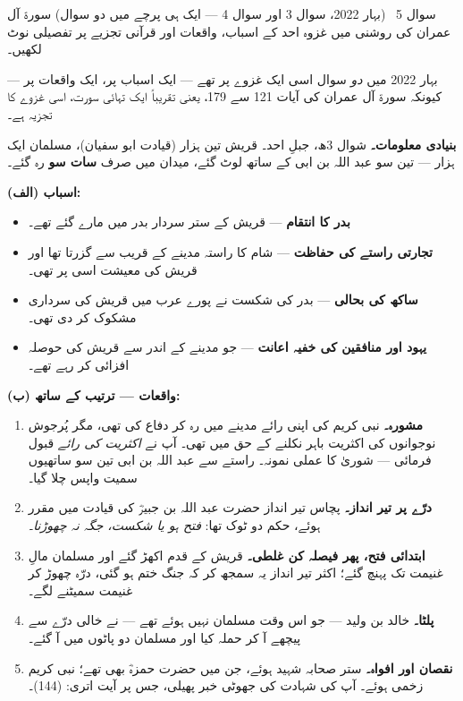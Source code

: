 \begin{sawal}{سوال \textenglish{5} \ \textnormal{\small(بہار \textenglish{2022}، سوال \textenglish{3} اور سوال \textenglish{4} --- ایک ہی پرچے میں دو سوال)}}
سورۃ آل عمران کی روشنی میں غزوہ احد کے اسباب، واقعات اور قرآنی تجزیے پر تفصیلی
نوٹ لکھیں۔
\end{sawal}

\begin{hal}
بہار \textenglish{2022} میں \emph{دو} سوال اسی ایک غزوے پر تھے --- ایک اسباب
پر، ایک واقعات پر --- کیونکہ سورۃ آل عمران کی آیات \textenglish{121} سے
\textenglish{179}، یعنی تقریباً ایک تہائی سورت، اسی غزوے کا تجزیہ ہے۔

\medskip
\textbf{بنیادی معلومات۔} شوال \textenglish{3}ھ، جبلِ احد۔ قریش تین ہزار
(قیادت ابو سفیان)، مسلمان ایک ہزار --- تین سو عبد اللہ بن ابی کے ساتھ لوٹ
گئے، میدان میں صرف \textbf{سات سو} رہ گئے۔

\medskip
\textbf{(الف) اسباب:}
\begin{itemize}\setlength{\itemsep}{1pt}
  \item \textbf{بدر کا انتقام} --- قریش کے ستر سردار بدر میں مارے گئے تھے۔
  \item \textbf{تجارتی راستے کی حفاظت} --- شام کا راستہ مدینے کے قریب سے گزرتا
        تھا اور قریش کی معیشت اسی پر تھی۔
  \item \textbf{ساکھ کی بحالی} --- بدر کی شکست نے پورے عرب میں قریش کی سرداری
        مشکوک کر دی تھی۔
  \item \textbf{یہود اور منافقین کی خفیہ اعانت} --- جو مدینے کے اندر سے قریش
        کی حوصلہ افزائی کر رہے تھے۔
\end{itemize}

\medskip
\textbf{(ب) واقعات --- ترتیب کے ساتھ:}
\begin{enumerate}\setlength{\itemsep}{1pt}
  \item \textbf{مشورہ۔} نبی کریم \saw کی اپنی رائے مدینے میں رہ کر دفاع کی تھی،
        مگر پُرجوش نوجوانوں کی اکثریت باہر نکلنے کے حق میں تھی۔ آپ \saw نے
        \emph{اکثریت کی رائے} قبول فرمائی --- شوریٰ کا عملی نمونہ۔ راستے سے
        عبد اللہ بن ابی تین سو ساتھیوں سمیت واپس چلا گیا۔
  \item \textbf{درّے پر تیر انداز۔} پچاس تیر انداز حضرت عبد اللہ بن جبیرؓ کی
        قیادت میں مقرر ہوئے، حکم دو ٹوک تھا: \emph{فتح ہو یا شکست، جگہ نہ
        چھوڑنا۔}
  \item \textbf{ابتدائی فتح، پھر فیصلہ کن غلطی۔} قریش کے قدم اکھڑ گئے اور
        مسلمان مالِ غنیمت تک پہنچ گئے؛ اکثر تیر انداز یہ سمجھ کر کہ جنگ ختم ہو
        گئی، درّہ چھوڑ کر غنیمت سمیٹنے لگے۔
  \item \textbf{پلٹا۔} خالد بن ولید --- جو اس وقت مسلمان نہیں ہوئے تھے ---
        نے خالی درّے سے پیچھے آ کر حملہ کیا اور مسلمان دو پاٹوں میں آ گئے۔
  \item \textbf{نقصان اور افواہ۔} ستر صحابہ شہید ہوئے، جن میں حضرت حمزہؓ بھی
        تھے؛ نبی کریم \saw زخمی ہوئے۔ آپ \saw کی شہادت کی جھوٹی خبر پھیلی، جس
        پر آیت اتری:  (\textenglish{144})۔
\end{enumerate}


\end{hal}
